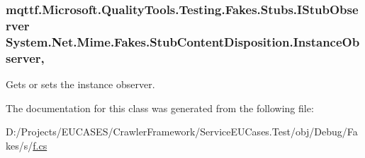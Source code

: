 \hypertarget{class_system_1_1_net_1_1_mime_1_1_fakes_1_1_stub_content_disposition_a88d873e5fbd6b61ea4f50b87622a94ee}{
\subsubsection[{Instance\-Observer}]{\setlength{\rightskip}{0pt plus 5cm}mqttf.\-Microsoft.\-Quality\-Tools.\-Testing.\-Fakes.\-Stubs.\-I\-Stub\-Observer System.\-Net.\-Mime.\-Fakes.\-Stub\-Content\-Disposition.\-Instance\-Observer\hspace{0.3cm}{\ttfamily [get]}, {\ttfamily [set]}}}\label{class_system_1_1_net_1_1_mime_1_1_fakes_1_1_stub_content_disposition_a88d873e5fbd6b61ea4f50b87622a94ee}


Gets or sets the instance observer.



The documentation for this class was generated from the following file\-:\begin{DoxyCompactItemize}
\item 
D\-:/\-Projects/\-E\-U\-C\-A\-S\-E\-S/\-Crawler\-Framework/\-Service\-E\-U\-Cases.\-Test/obj/\-Debug/\-Fakes/s/\hyperlink{s_2f_8cs}{f.\-cs}\end{DoxyCompactItemize}
